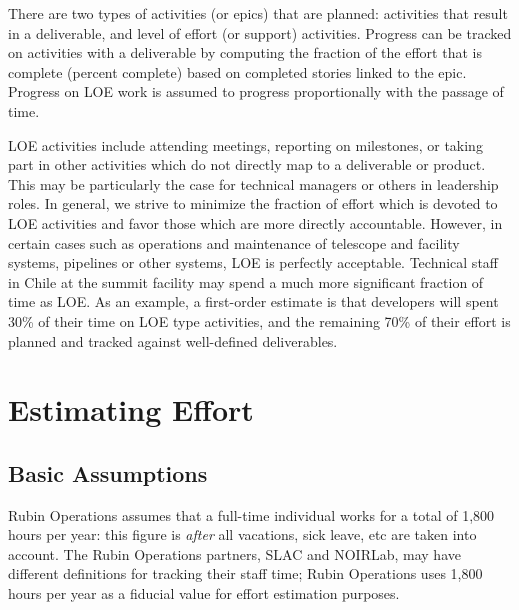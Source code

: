 There are two types of activities (or epics) that are planned:  activities that result in a deliverable, and level of effort (or support) activities.
Progress can be tracked on activities with a deliverable by computing the fraction of the effort that is complete (percent complete) based on completed stories linked to the epic.
Progress on \gls{LOE} work is assumed to progress proportionally with the passage of time.

\gls{LOE} activities include attending meetings, reporting on milestones, or taking part in other activities which do not directly map to a deliverable or product.
This may be particularly the case for technical managers or others in leadership roles.
In general, we strive to minimize the fraction of effort which is devoted to \gls{LOE} activities and favor those which are more directly accountable.
However, in certain cases such as operations and maintenance of telescope and facility systems, pipelines or other systems, \gls{LOE} is perfectly acceptable.
Technical staff in Chile at the summit facility may spend a much more significant fraction of time as \gls{LOE}.
As an example, a first-order estimate is that developers will spent 30\% of their time on \gls{LOE} type activities, and the remaining 70\% of their effort is planned and tracked against well-defined deliverables.


\section{Estimating Effort}
\label{sec:effort}

\subsection{Basic Assumptions}


Rubin Operations assumes that a full-time individual works for a total of 1,800 hours per year: this figure is \emph{after} all vacations, sick leave, etc are taken into account.
The Rubin Operations partners, SLAC and NOIRLab, may have different definitions for tracking their staff time; Rubin Operations uses 1,800 hours per year as a fiducial value for effort estimation purposes.


